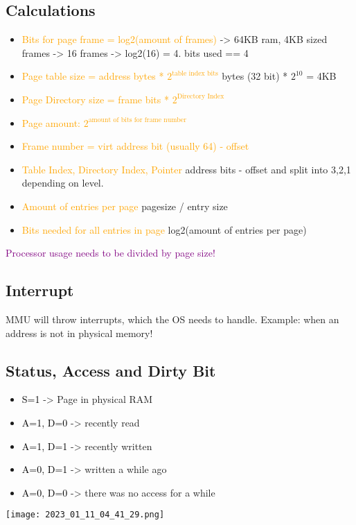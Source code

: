 \documentclass[main.tex,fontsize=7pt,paper=a4,paper=landscape,DIV=calc,]{scrartcl}
\begin{document}
\begin{multicols*}{4}
\subsection{Calculations}
\begin{itemize}
\item \textcolor{orange}{Bits for page frame = log2(amount of frames)}\newline
  -> 64KB ram, 4KB sized frames -> 16 frames\newline
  -> log2(16) = 4. bits used == 4
\item \textcolor{orange}{Page table size = address bytes * \(2^{\text{table index bits}}\)} bytes (32 bit) * \(2^10\) = 4KB 
\item \textcolor{orange}{Page Directory size = frame bits * \(2^{\text{Directory Index}}\) }
\item \textcolor{orange}{Page amount: \(2^\text{amount of bits for frame number}\)}
\item \textcolor{orange}{Frame number = virt address bit (usually 64) - offset}
\item \textcolor{orange}{Table Index, Directory Index, Pointer}\newline
  address bits - offset and split into 3,2,1 depending on level.
\item \textcolor{orange}{Amount of entries per page} pagesize / entry size
\item \textcolor{orange}{Bits needed for all entries in page} log2(amount of entries per page)
\end{itemize}
\textcolor{purple}{Processor usage needs to be divided by page size!}

\subsection{Interrupt}
MMU will throw interrupts, which the OS needs to handle.\newline
Example: when an address is not in physical memory!\newline

\subsection{Status, Access and Dirty Bit}
\begin{itemize}
\item \textcolor{black}{S=1} -> Page in physical RAM
\item \textcolor{black}{A=1, D=0} -> recently read
\item \textcolor{black}{A=1, D=1} -> recently written
\item \textcolor{black}{A=0, D=1} -> written a while ago
\item \textcolor{black}{A=0, D=0} -> there was no access for a while
\end{itemize}
\texttt{[image: 2023\_01\_11\_04\_41\_29.png]}


\end{multicols*}
\end{document}
